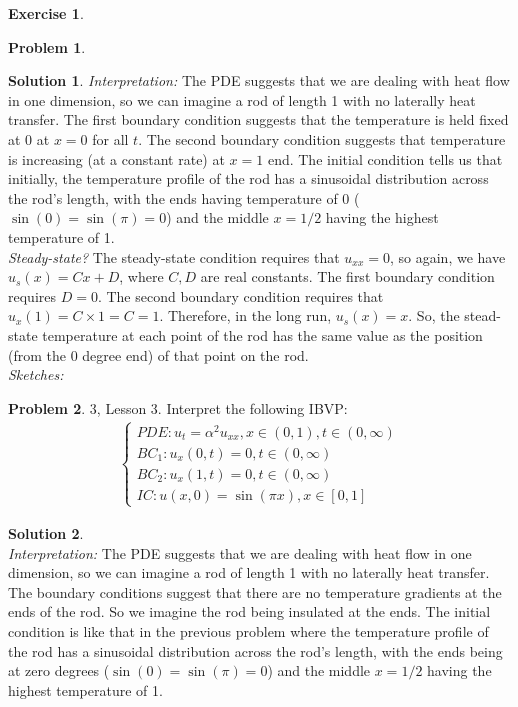 \documentclass{book}
\theoremstyle{definition}
\newtheorem{sln}{Solution}[section]
\newtheorem*{prob*}{Problem}
\newtheorem*{exer*}{Exercise}
\begin{document}
\begin{exer*}
\begin{prob*}
\begin{sln}
			\textit{Interpretation:} The PDE suggests that we are dealing with heat flow in one dimension, so we can imagine a rod of length 1 with no laterally heat transfer. The first boundary condition suggests that the temperature is held fixed at 0 at $x=0$ for all $t$. The second boundary condition suggests that temperature is increasing (at a constant rate) at $x=1$ end. The initial condition tells us that initially, the temperature profile of the rod has a sinusoidal distribution across the rod's length, with the ends having temperature of 0 ($\sin(0)=\sin(\pi) = 0$) and the middle $x=1/2$ having the highest temperature of 1. \\
			
			\textit{Steady-state?} The steady-state condition requires that $u_{xx} = 0$, so again, we have $u_s(x) = Cx +D$, where $C,D$ are real constants. The first boundary condition requires $D=0$. The second boundary condition requires that $u_x(1) = C\times 1 = C = 1$. Therefore, in the long run, $u_s(x) = x$. So, the stead-state temperature at each point of the rod has the same value as the position (from the 0 degree end) of that point on the rod. \\
			
			\textit{Sketches:}
		\end{sln}
	\end{prob*}
	\newpage
	\begin{prob*}3, Lesson 3. Interpret the following IBVP:
		\begin{align*}
		\begin{cases}
		PDE: u_t = \alpha^2 u_{xx}, x\in(0,1), t\in(0,\infty)\\
		BC_1: u_x(0,t) = 0, t\in(0,\infty)\\
		BC_2: u_x(1,t) = 0, t\in(0,\infty)\\
		IC: u(x,0) = \sin(\pi x), x\in[0,1]
		\end{cases}
		\end{align*}
		\begin{sln}
			$\,$\\
			
			\textit{Interpretation:} The PDE suggests that we are dealing with heat flow in one dimension, so we can imagine a rod of length 1 with no laterally heat transfer. The boundary conditions suggest that there are no temperature gradients at the ends of the rod. So we imagine the rod being insulated at the ends. The initial condition is like that in the previous problem where the temperature profile of the rod has a sinusoidal distribution across the rod's length, with the ends being at zero degrees ($\sin(0)=\sin(\pi) = 0$) and the middle $x=1/2$ having the highest temperature of 1. \\
			

\end{sln}
\end{prob*}
\end{exer*}
\end{document}

